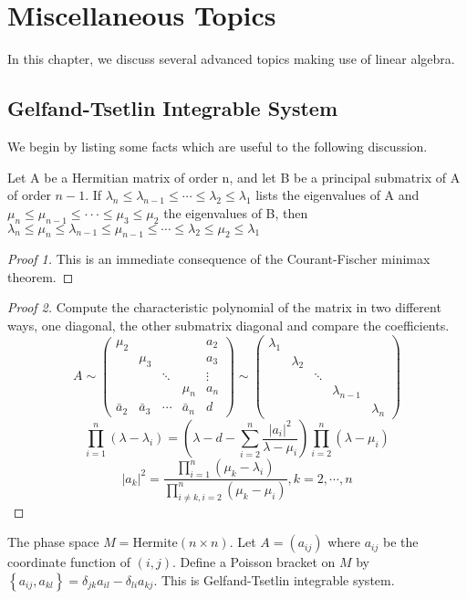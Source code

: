 
\chapter{Miscellaneous Topics}
In this chapter, we discuss several advanced topics making use of linear algebra.
\section{Gelfand-Tsetlin Integrable System}
We begin by listing some facts which are useful to the following discussion.
\begin{theorem}
Let A be a Hermitian matrix of order n, and let B be a principal submatrix of A of order $n-1$. If $\lambda_n \le \lambda_{n-1} \le\cdots\le \lambda_2 \le \lambda_1$ lists the eigenvalues of A and $\mu_n \le \mu_{n-1} \le···\le \mu_3 \le \mu_2$ the eigenvalues of B, then $\lambda_n \le \mu_n \le \lambda_{n-1} \le \mu_{n-1} \le\cdots\le \lambda_2 \le \mu_2 \le \lambda_1$
\end{theorem}
\begin{proof}[Proof 1]
This is an immediate consequence of the Courant-Fischer minimax theorem.
\end{proof}
\begin{proof}[Proof 2]
Compute the characteristic polynomial of the matrix in two different ways, one diagonal, the other submatrix diagonal and compare the coefficients. 
\[A\sim \begin{pmatrix}\mu_2 &  &  &  & a_2\\ & \mu_3 &  &  & a_3\\ &  &\ddots &  & \vdots\\&  &  & \mu_n &a_n \\\bar{a}_2& \bar{a}_3 & \cdots & \bar{a}_n &d
\end{pmatrix}\sim\begin{pmatrix}\lambda_1 &  &  &  & \\& \lambda_2 &  &  & \\ &  & \ddots &  & \\ &  &  & \lambda_{n-1} & \\&  &  &  &\lambda_n\end{pmatrix}\]
\[\prod_{i=1}^{n} (\lambda-\lambda_i)=(\lambda-d-\sum_{i=2}^{n}\frac{\left | a_i \right |^2}{\lambda-\mu_i})  \prod_{i=2}^{n}(\lambda-\mu_i) \]
\[\left | a_k \right | ^2=\frac{\prod _{i=1}^{n}(\mu_k-\lambda_i)}{\prod _{i\ne k,i=2}^n(\mu_k-\mu_i)}, k=2,\cdots,n\]
\end{proof}
\begin{definition}
The phase space $M=\text{Hermite}(n\times n)$. Let $A=(a_{ij})$ where $a_{ij}$ be the coordinate function of $(i,j)$. Define a Poisson bracket on $M$ by $\left\{a_{ij},a_{kl}\right\}=\delta_{jk}a_{il}-\delta_{li}a_{kj}$. This is Gelfand-Tsetlin integrable system.
\end{definition}
